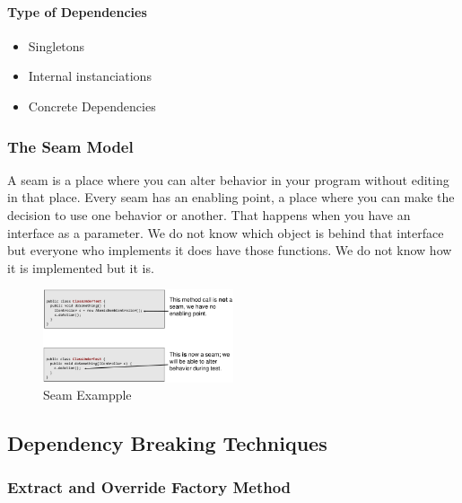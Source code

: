 \hypertarget{type-of-dependencies}{%
\paragraph{Type of Dependencies}\label{type-of-dependencies}}

\begin{itemize}
\tightlist
\item
  Singletons
\item
  Internal instanciations
\item
  Concrete Dependencies
\end{itemize}

\hypertarget{the-seam-model}{%
\subsubsection{The Seam Model}\label{the-seam-model}}

A seam is a place where you can alter behavior in your program without
editing in that place. Every seam has an enabling point, a place where
you can make the decision to use one behavior or another. That happens when you have an interface as a parameter. We do not know which object is behind that interface but everyone who implements it does have those functions. We do not know how it is implemented but it is.


\begin{figure}[H]
\centering
\includegraphics[width=0.5\textwidth]{figures/seamExample.png}
\caption{Seam Exampple}
\end{figure}


\clearpage
\hypertarget{dependency-breaking-techniques}{%
\subsection{Dependency Breaking
Techniques}\label{dependency-breaking-techniques}}

\hypertarget{extract-and-override-factory-method}{%
\subsubsection{Extract and Override Factory
Method}\label{extract-and-override-factory-method}}

